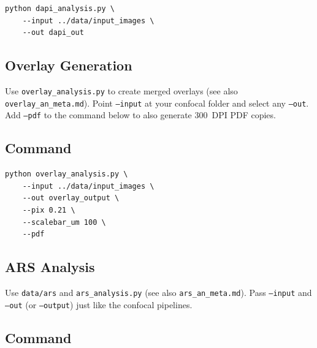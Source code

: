 \documentclass[11pt,a4paper]{article}
\begin{document}
\begin{center}
\begin{minipage}{0.9\linewidth}
\begin{verbatim}
python dapi_analysis.py \
    --input ../data/input_images \
    --out dapi_out
\end{verbatim}
\end{minipage}
\end{center}


\subsection{Overlay Generation}

Use \texttt{overlay\_analysis.py} to create merged overlays  
(see also \texttt{overlay\_an\_meta.md}).  
Point \texttt{--input} at your confocal folder and select any \texttt{--out}.
Add \texttt{--pdf} to the command below to also generate 300~DPI PDF copies.

\subsection*{Command}

\begin{center}
\begin{minipage}{0.9\linewidth}
\begin{verbatim}
python overlay_analysis.py \
    --input ../data/input_images \
    --out overlay_output \
    --pix 0.21 \
    --scalebar_um 100 \
    --pdf
\end{verbatim}
\end{minipage}
\end{center}


\subsection{ARS Analysis}

Use \texttt{data/ars} and \texttt{ars\_analysis.py}  
(see also \texttt{ars\_an\_meta.md}).  
Pass \texttt{--input} and \texttt{--out} (or \texttt{--output}) just like the confocal pipelines.

\subsection*{Command}
\end{document}
